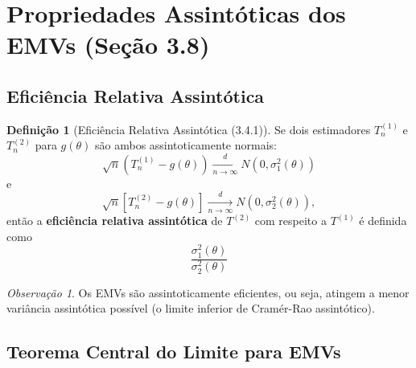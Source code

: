 \documentclass[12pt,a4paper]{article}
\theoremstyle{plain}
\theoremstyle{definition}
\newtheorem{definicao}[teorema]{Definição}
\theoremstyle{remark}
\newtheorem{observacao}[teorema]{Observação}
\begin{document}
\section{Propriedades Assintóticas dos EMVs (Seção 3.8)}

\subsection{Eficiência Relativa Assintótica}

\begin{definicao}[Eficiência Relativa Assintótica (3.4.1)]
Se dois estimadores $T_n^{(1)}$ e $T_n^{(2)}$ para $g(\theta)$ são ambos assintoticamente normais:
\[
\sqrt{n} \left( T_n^{(1)} - g(\theta) \right) \xrightarrow[n \to \infty]{d} N\left(0, \sigma_1^2(\theta)\right)
\]
e
\[
\sqrt{n} \left[ T_n^{(2)} - g(\theta) \right] \xrightarrow[n \to \infty]{d} N\left(0, \sigma_2^2(\theta)\right),
\]
então a \textbf{eficiência relativa assintótica} de $T^{(2)}$ com respeito a $T^{(1)}$ é definida como
\[
\frac{\sigma_1^2(\theta)}{\sigma_2^2(\theta)}
\]
\end{definicao}

\begin{observacao}
Os EMVs são assintoticamente eficientes, ou seja, atingem a menor variância assintótica possível (o limite inferior de Cramér-Rao assintótico).
\end{observacao}

\subsection{Teorema Central do Limite para EMVs}
\end{document}
